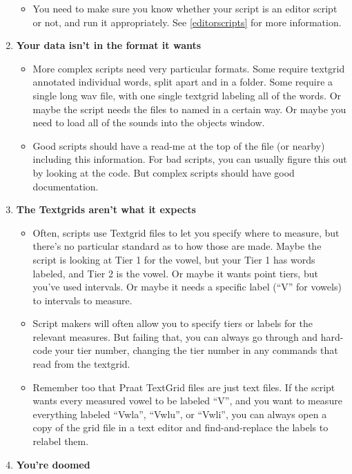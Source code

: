 \documentclass[11pt]{article}
\def\tightlist{}
\begin{document}
\begin{enumerate}
  \begin{itemize}
  \tightlist
  \item
    You need to make sure you know whether your script is an editor
    script or not, and run it appropriately. See \ref{editorscripts} for
    more information.
  \end{itemize}
\item
  \textbf{Your data isn't in the format it wants}

  \begin{itemize}
  \tightlist
  \item
    More complex scripts need very particular formats. Some require
    textgrid annotated individual words, split apart and in a folder.
    Some require a single long wav file, with one single textgrid
    labeling all of the words. Or maybe the script needs the files to
    named in a certain way. Or maybe you need to load all of the sounds
    into the objects window.
  \item
    Good scripts should have a read-me at the top of the file (or
    nearby) including this information. For bad scripts, you can usually
    figure this out by looking at the code. But complex scripts should
    have good documentation.
  \end{itemize}
\item
  \textbf{The Textgrids aren't what it expects}

  \begin{itemize}
  \tightlist
  \item
    Often, scripts use Textgrid files to let you specify where to
    measure, but there's no particular standard as to how those are
    made. Maybe the script is looking at Tier 1 for the vowel, but your
    Tier 1 has words labeled, and Tier 2 is the vowel. Or maybe it wants
    point tiers, but you've used intervals. Or maybe it needs a specific
    label (``V'' for vowels) to intervals to measure.
  \item
    Script makers will often allow you to specify tiers or labels for
    the relevant measures. But failing that, you can always go through
    and hard-code your tier number, changing the tier number in any
    commands that read from the textgrid.
  \item
    Remember too that Praat TextGrid files are just text files. If the
    script wants every measured vowel to be labeled ``V'', and you want
    to measure everything labeled ``Vwla'', ``Vwlu'', or ``Vwli'', you
    can always open a copy of the grid file in a text editor and
    find-and-replace the labels to relabel them.
  \end{itemize}
\item
  \textbf{You're doomed}


\end{enumerate}
\end{document}
